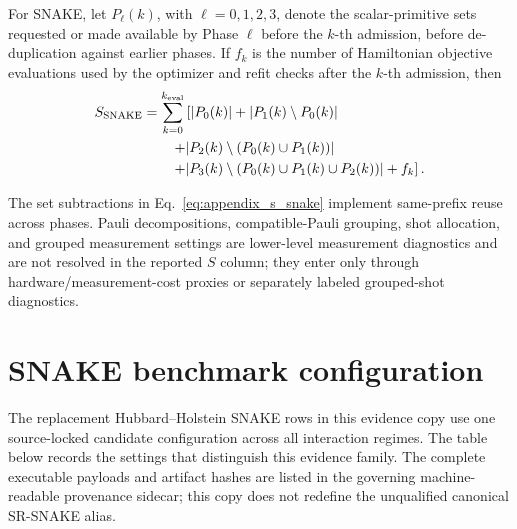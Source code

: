 \documentclass[
  reprint,
  amsmath,
  amssymb,
  aps,
  pra,
  nofootinbib,
  superscriptaddress,
  floatfix
]{revtex4-2}
\begin{document}
For SNAKE, let \(P_\ell(k)\), with \(\ell=0,1,2,3\), denote the scalar-primitive sets requested or made available by Phase \(\ell\) before the \(k\)-th admission, before de-duplication against earlier phases. If \(f_k\) is the number of Hamiltonian objective evaluations used by the optimizer and refit checks after the \(k\)-th admission, then
\begin{align}
S_{\rm SNAKE}
&=
\sum_{k=0}^{k_{\rm eval}}
\left[
|P_0(k)|+|P_1(k)\setminus P_0(k)|
\right.
\nonumber\\
&\qquad\left.
 +|P_2(k)\setminus(P_0(k)\cup P_1(k))|
\right.
\nonumber\\
&\qquad\left.
 +|P_3(k)\setminus(P_0(k)\cup P_1(k)\cup P_2(k))|
+f_k
\right].
\label{eq:appendix_s_snake}
\end{align}

The set subtractions in Eq.~\eqref{eq:appendix_s_snake} implement same-prefix reuse across phases. Pauli decompositions, compatible-Pauli grouping, shot allocation, and grouped measurement settings are lower-level measurement diagnostics and are not resolved in the reported \(S\) column; they enter only through hardware/measurement-cost proxies or separately labeled grouped-shot diagnostics.

\section{SNAKE benchmark configuration}
\label{app:results_discussion}

The replacement Hubbard--Holstein SNAKE rows in this evidence copy use one
source-locked candidate configuration across all interaction regimes. The
table below records the settings that distinguish this evidence family. The
complete executable payloads and artifact hashes are listed in the governing
machine-readable provenance sidecar; this copy does not redefine the
unqualified canonical SR-SNAKE alias.
\end{document}
